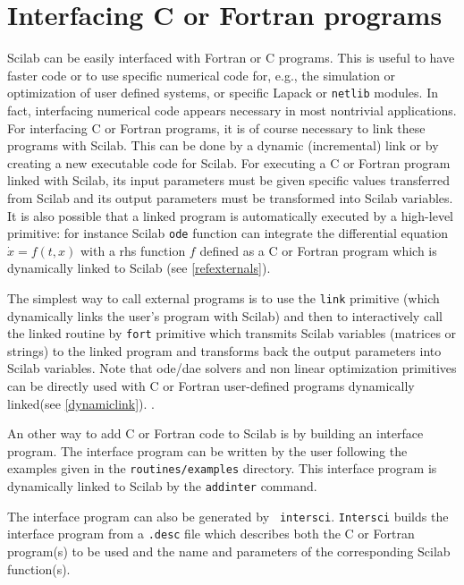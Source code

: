 %

\chapter{Interfacing C or Fortran programs}

Scilab can be easily interfaced with Fortran or C programs. 
This is useful to have faster code or to use specific numerical
code for, e.g., the simulation or optimization of
user defined systems, or specific Lapack or {\tt netlib} modules. 
In fact, interfacing numerical code appears necessary in most
nontrivial applications. For
interfacing C or Fortran programs, it is of course necessary to link
these programs with Scilab. This can be done by a dynamic
(incremental) link or by creating a new executable code for Scilab.
For executing a C or Fortran program linked with Scilab, its
input parameters must be given specific values transferred from Scilab
and its output
parameters must be transformed into Scilab variables.
It is also possible that a linked program is automatically executed
by a high-level primitive: for instance Scilab {\tt ode} function
can integrate the differential equation $\dot{x} = f(t,x)$ with a
rhs function $f$ defined as a C or Fortran program which is
dynamically linked to Scilab (see \ref{refexternals}).


\bigskip
{}


The simplest way to call external programs is to use the  
{\tt link} primitive
(which dynamically links the user's program with Scilab)
and then to interactively call
the linked routine by {\tt fort} primitive
which transmits Scilab variables (matrices or strings) to the linked program
and transforms back the output parameters into Scilab variables. 
Note that ode/dae solvers and non linear optimization primitives
can be directly used with C or Fortran user-defined programs
dynamically linked(see \ref{dynamiclink}). . 

An other way to add C or Fortran code to Scilab is by 
building an interface program. The interface program can be written by
the user following the examples given in the {\tt routines/examples}
directory. This interface program is dynamically linked to Scilab
by the {\tt addinter} command.

The interface program can also be generated by {\tt
intersci}. {\tt Intersci} builds the interface
program from a {\tt .desc} file which describes both the C or 
Fortran program(s) to be used and the name and parameters of
the corresponding Scilab function(s). 

